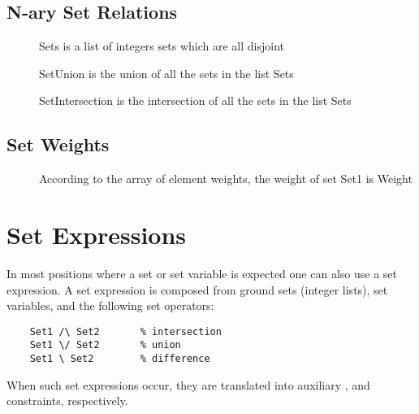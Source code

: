 \subsection{N-ary Set Relations}

\begin{description}
\item[]
         Sets is a list of integers sets which are all disjoint 
\item[]
         SetUnion is the union of all the sets in the list Sets 
\item[]
         SetIntersection is the intersection of all the sets in the list Sets 
\end{description}


\subsection{Set Weights}

\begin{description}
\item[]
         According to the array of element weights, the weight of set Set1 is Weight 
\end{description}


\section{Set Expressions}

In most positions where a set or set variable is expected one can also
use a set expression. A set expression is composed from ground sets
(integer lists), set variables, and the following set operators:
\begin{verbatim}
    Set1 /\ Set2       % intersection
    Set1 \/ Set2       % union
    Set1 \ Set2        % difference
\end{verbatim}
When such set expressions occur, they are translated into auxiliary
,
 and
constraints, respectively.


